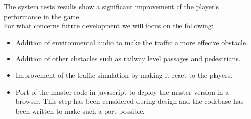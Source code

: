 \documentclass[12pt]{article}
\newcommand\blankpage{%
    \null
    \thispagestyle{empty}%
    \addtocounter{page}{-1}%
    \newpage}
\begin{document}
The system tests results show a significant improvement of the player's performance in the game. \\

For what concerns future development we will focus on the following:

\begin{itemize}
	\item Addition of environmental audio to make the traffic a more effecive obstacle.
	\item Addition of other obstacles such as railway level passages and pedestrians.
	\item Improvement of the traffic simulation by making it react to the players. 
	\item Port of the master code in javascript to deploy the master version in a browser. This step has been considered during design and the codebase has been written to make such a port possible.
\end{itemize}

\afterpage{\blankpage}

\clearpage
\end{document}

